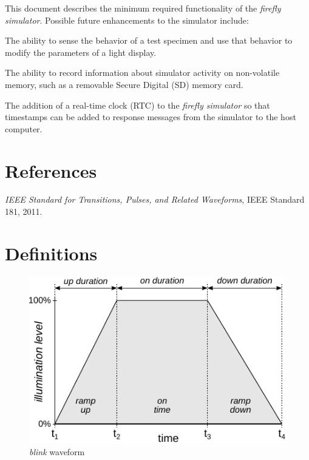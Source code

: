 \documentclass[letterpaper,11pt]{article}
\begin{document}
This document describes the minimum required functionality of the
\textit{firefly simulator}. Possible future enhancements to the simulator
include:
\begin{compactitem}
  \item The ability to sense the behavior of a test specimen and use that
    behavior to modify the parameters of a light display.
  \item The ability to record information about simulator activity on
    non-volatile memory, such as a removable Secure Digital (SD) memory card.
  \item The addition of a real-time clock (RTC) to the \textit{firefly
    simulator} so that timestamps can be added to response messages from the 
    simulator to the host computer.
\end{compactitem}

\section{References}

\textit{IEEE Standard for Transitions, Pulses, and Related Waveforms},
  IEEE Standard 181, 2011.

\section{Definitions}

\begin{figure}[h]
  \begin{center}
    \includegraphics{Flashes_BlinkPulse}
  \end{center}
  \vspace{-18pt}
  \caption{\textit{blink} waveform}
  \label{fig:blinkpulse}
\end{figure}
\end{document}
